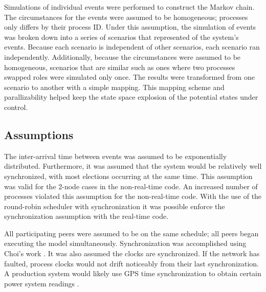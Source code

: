 Simulations of individual events were performed to construct the Markov chain.
The circumstances for the events were assumed to be homogeneous; processes only differs by their process ID.
Under this assumption, the simulation of events was broken down into a series of scenarios that represented of the system's events.
Because each scenario is independent of other scenarios, each scenario ran independently.
Additionally, because the circumstances were assumed to be homogeneous, scenarios that are similar such as ones where two processes swapped roles were simulated only once. 
The results were transformed from one scenario to another with a simple mapping.
This mapping scheme and parallizability helped keep the state space explosion of the potential states under control.

\subsection{Assumptions}

The inter-arrival time between events was assumed to be exponentially distributed.
Furthermore, it was assumed that the system would be relatively well synchronized, with most elections occurring at the same time.
This assumption was valid for the 2-node cases in the non-real-time code. 
An increased number of processes violated this assumption for the non-real-time code.
With the use of the round-robin scheduler with synchronization it was possible enforce the synchronization assumption with the real-time code.

All participating peers were assumed to be on the same schedule; all peers began executing the model simultaneously.
Synchronization was accomplished using Choi's work \cite{DCS}.
It was also assumed the clocks are synchronized. 
If the network has faulted, process clocks would not drift noticeably from their last synchronization.
A production system would likely use GPS time synchronization to obtain certain power system readings \cite{PHASORREADINGS}.
